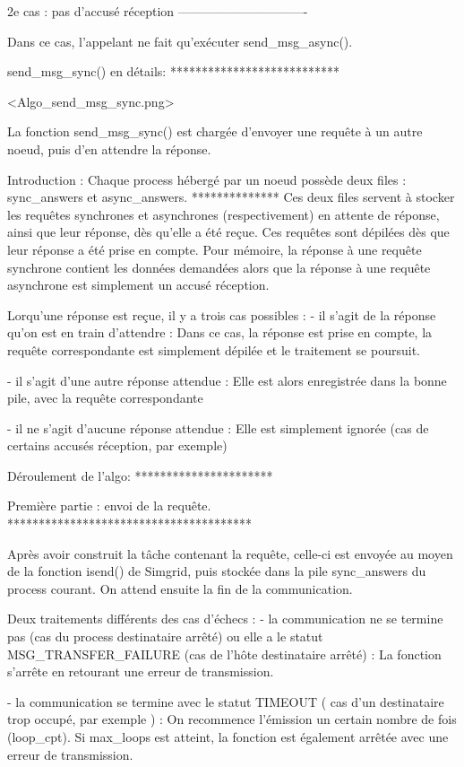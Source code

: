 2e cas : pas d'accusé réception
-------------------------------

Dans ce cas, l'appelant ne fait qu'exécuter send_msg_async().


send_msg_sync() en détails:
***************************

<Algo_send_msg_sync.png>

La fonction send_msg_sync() est chargée d'envoyer une requête à un autre noeud, puis d'en attendre
la réponse.

Introduction : Chaque process hébergé par un noeud possède deux files : sync_answers et async_answers.
**************
Ces deux files servent à stocker les requêtes synchrones et asynchrones (respectivement) en attente
de réponse, ainsi que leur réponse, dès qu'elle a été reçue. Ces requêtes sont dépilées dès que leur
réponse a été prise en compte.
Pour mémoire, la réponse à une requête synchrone contient les données demandées alors que la réponse
à une requête asynchrone est simplement un accusé réception.

Lorqu'une réponse est reçue, il y a trois cas possibles :
- il s'agit de la réponse qu'on est en train d'attendre :
  Dans ce cas, la réponse est prise en compte, la requête correspondante est simplement dépilée et
  le traitement se poursuit.

- il s'agit d'une autre réponse attendue :
  Elle est alors enregistrée dans la bonne pile, avec la requête correspondante

- il ne s'agit d'aucune réponse attendue :
  Elle est simplement ignorée (cas de certains accusés réception, par exemple)

Déroulement de l'algo:
**********************

Première partie : envoi de la requête.
***************************************

Après avoir construit la tâche contenant la requête, celle-ci est envoyée au moyen de la fonction
isend() de Simgrid, puis stockée dans la pile sync_answers du process courant.
On attend ensuite la fin de la communication.

Deux traitements différents des cas d'échecs :
- la communication ne se termine pas (cas du process destinataire arrêté) ou elle a le statut
  MSG_TRANSFER_FAILURE (cas de l'hôte destinataire arrêté) :
  La fonction s'arrête en retourant une erreur de transmission.

- la communication se termine avec le statut TIMEOUT ( cas d'un destinataire trop occupé, par
  exemple ) :
  On recommence l'émission un certain nombre de fois (loop_cpt).
  Si max_loops est atteint, la fonction est également arrêtée avec une erreur de transmission.


